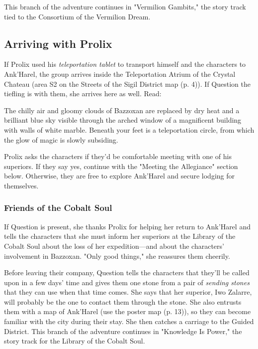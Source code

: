 \documentclass[letterpaper, 11pt, bg=full, twocolumn]{dndbook}
\begin{document}
This branch of the adventure continues in "Vermilion Gambits," the story track tied to the Consortium of the Vermilion Dream.

\subsection{Arriving with Prolix}

If Prolix used his \textit{teleportation tablet} to transport himself and the characters to Ank'Harel, the group arrives inside the Teleportation Atrium of the Crystal Chateau (area S2 on the Streets of the Sigil District map (p. 4)). If Question the tiefling is with them, she arrives here as well. Read:

\begin{DndReadAloud}
The chilly air and gloomy clouds of Bazzoxan are replaced by dry heat and a brilliant blue sky visible through the arched window of a magnificent building with walls of white marble. Beneath your feet is a teleportation circle, from which the glow of magic is slowly subsiding.
\end{DndReadAloud}

Prolix asks the characters if they'd be comfortable meeting with one of his superiors. If they say yes, continue with the "Meeting the Allegiance" section below. Otherwise, they are free to explore Ank'Harel and secure lodging for themselves.

\subsubsection{Friends of the Cobalt Soul}

If Question is present, she thanks Prolix for helping her return to Ank'Harel and tells the characters that she must inform her superiors at the Library of the Cobalt Soul about the loss of her expedition---and about the characters' involvement in Bazzoxan. "Only good things," she reassures them cheerily.

Before leaving their company, Question tells the characters that they'll be called upon in a few days' time and gives them one stone from a pair of \textit{sending stones} that they can use when that time comes. She says that her superior, Iwo Zalarre, will probably be the one to contact them through the stone. She also entrusts them with a map of Ank'Harel (use the poster map (p. 13)), so they can become familiar with the city during their stay. She then catches a carriage to the Guided District. This branch of the adventure continues in "Knowledge Is Power," the story track for the Library of the Cobalt Soul.
\end{document}
